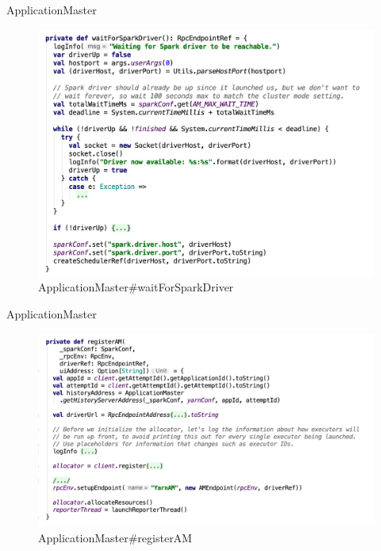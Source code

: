 \begin{frame}[plain,t]{ApplicationMaster} %
	 \\  
	\begin{figure}
		\centering
		\includegraphics[width=0.85\linewidth]{images/app007}
		\caption{ApplicationMaster\#waitForSparkDriver}
		\label{fig:app007}
	\end{figure}
	
\end{frame}
\begin{frame}[plain,t]{ApplicationMaster} %
	 \\ 
	\begin{figure}
		\centering
		\includegraphics[width=0.9\linewidth]{images/app008}
		\caption{ApplicationMaster\#registerAM}
		\label{fig:app008}
	\end{figure}
	
\end{frame}
